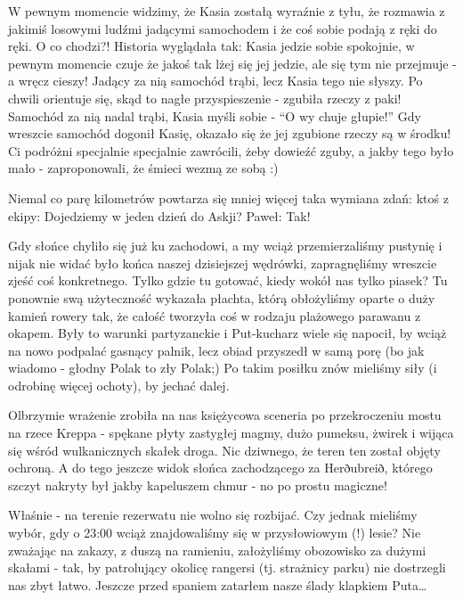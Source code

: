 
W pewnym momencie widzimy, że Kasia zostałą wyraźnie z tyłu, że rozmawia z jakimiś losowymi ludźmi jadącymi samochodem i że coś sobie podają z ręki do ręki. O co chodzi?! Historia wyglądała tak: Kasia jedzie sobie spokojnie, w pewnym momencie czuje że jakoś tak lżej się jej jedzie, ale się tym nie przejmuje - a wręcz cieszy! Jadący za nią samochód trąbi, lecz Kasia tego nie słyszy. Po chwili orientuje się, skąd to nagłe przyspieszenie - zgubiła rzeczy z paki! Samochód za nią nadal trąbi, Kasia myśli sobie - “O wy chuje głupie!” Gdy wreszcie samochód dogonił Kasię, okazało się że jej zgubione rzeczy są w środku! Ci podróżni specjalnie specjalnie zawrócili, żeby dowieźć zguby, a jakby tego było mało - zaproponowali, że śmieci wezmą ze sobą :)

Niemal co parę kilometrów powtarza się mniej więcej taka wymiana zdań:
ktoś z ekipy: Dojedziemy w jeden dzień do Askji?
Paweł: Tak!


Gdy słońce chyliło się już ku zachodowi, a my wciąż przemierzaliśmy pustynię i nijak nie widać było końca naszej dzisiejszej wędrówki, zapragnęliśmy wreszcie zjeść coś konkretnego. Tylko gdzie tu gotować, kiedy wokół nas tylko piasek? Tu ponownie swą użyteczność wykazała płachta, którą obłożyliśmy oparte o duży kamień rowery tak, że całość tworzyła coś w rodzaju plażowego parawanu z okapem. Były to warunki partyzanckie i Put-kucharz wiele się napocił, by wciąż na nowo podpalać gasnący palnik, lecz obiad przyszedł w samą porę (bo jak wiadomo - głodny Polak to zły Polak;) Po takim posiłku znów mieliśmy siły (i odrobinę więcej ochoty), by jechać dalej.

Olbrzymie wrażenie zrobiła na nas księżycowa sceneria po przekroczeniu mostu na rzece Kreppa - spękane płyty zastygłej magmy, dużo pumeksu, żwirek i wijąca się wśród wulkanicznych skałek droga. Nic dziwnego, że teren ten został objęty ochroną. A do tego jeszcze widok słońca zachodzącego za Herðubreið, którego szczyt nakryty był jakby kapeluszem chmur - no po prostu magiczne!

Właśnie - na terenie rezerwatu nie wolno się rozbijać. Czy jednak mieliśmy wybór, gdy o 23:00 wciąż znajdowaliśmy się w przysłowiowym (!) lesie? Nie zważając na zakazy, z duszą na ramieniu, założyliśmy obozowisko za dużymi skałami - tak, by patrolujący okolicę rangersi (tj. strażnicy parku) nie dostrzegli nas zbyt łatwo. Jeszcze przed spaniem zatarłem nasze ślady klapkiem Puta…


